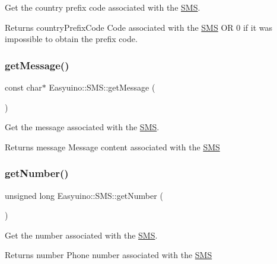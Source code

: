 Get the country prefix code associated with the \hyperlink{class_easyuino_1_1_s_m_s}{S\+MS}. 

\begin{DoxyReturn}{Returns}
country\+Prefix\+Code Code associated with the \hyperlink{class_easyuino_1_1_s_m_s}{S\+MS} OR 0 if it was impossible to obtain the prefix code. 
\end{DoxyReturn}
\mbox{\label{class_easyuino_1_1_s_m_s_ac13745969d572629274ae69f3f98ab2e}} 
\subsubsection{\texorpdfstring{get\+Message()}{getMessage()}}
{\footnotesize\ttfamily const char$\ast$ Easyuino\+::\+S\+M\+S\+::get\+Message (\begin{DoxyParamCaption}{ }\end{DoxyParamCaption})}



Get the message associated with the \hyperlink{class_easyuino_1_1_s_m_s}{S\+MS}. 

\begin{DoxyReturn}{Returns}
message Message content associated with the \hyperlink{class_easyuino_1_1_s_m_s}{S\+MS} 
\end{DoxyReturn}
\mbox{\label{class_easyuino_1_1_s_m_s_ab46be8f783d59208245e9d14d3a046d5}} 
\subsubsection{\texorpdfstring{get\+Number()}{getNumber()}}
{\footnotesize\ttfamily unsigned long Easyuino\+::\+S\+M\+S\+::get\+Number (\begin{DoxyParamCaption}{ }\end{DoxyParamCaption})}



Get the number associated with the \hyperlink{class_easyuino_1_1_s_m_s}{S\+MS}. 

\begin{DoxyReturn}{Returns}
number Phone number associated with the \hyperlink{class_easyuino_1_1_s_m_s}{S\+MS} 
\end{DoxyReturn}
\mbox{\label{class_easyuino_1_1_s_m_s_a05650de23138fee2dfc1ce9a8e2b0429}} 
